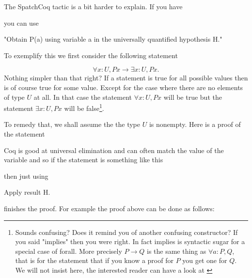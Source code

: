 The SpatchCoq tactic is a bit harder to explain. If you have

you can use 

"Obtain P(a) using variable a in the universally quantified hypothesis H."

To exemplify this we first consider the following statement

$$\forall x:U, P x \rightarrow \exists x:U, P x.$$
Nothing simpler than that right? If a statement is true for all possible values then is of course true for some value. Except for the case where there are no elements of type $U$ at all. In that case the statement $\forall x:U, P x$ will be true but the statement $\exists x:U, P x$ will be false\footnote{
 Sounds confusing? Does it remind you of another confusing constructor? If you said "implies" then you were right. In fact implies is syntactic sugar  for a special case of forall. More precisely $P\rightarrow Q$ is the same thing as $\forall a:P, Q$, that is for the statement that if you know a proof for $P$ you get one for $Q$. We will not insist here, the interested reader can have a look at \cite{coqdart}}.
 
 To remedy that, we shall assume the the type $U$ is nonempty. Here is a proof of the statement


 Coq is good at universal elimination and can often match the value of the variable  and so if the statement is something like this


then just using 

Apply result H.

 finishes the proof. For example the proof above can be done as follows:



